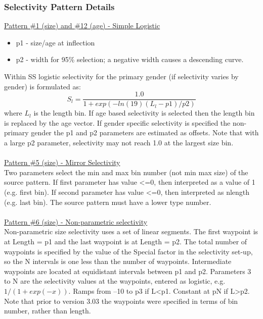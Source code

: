 \subsubsection{Selectivity Pattern Details}
\underline{Pattern \#1 (size) and \#12 (age) - Simple Logistic}
\begin{itemize}
	\item p1 - size/age at inflection
	\item p2 - width for 95\% selection; a negative width causes a descending curve.
\end{itemize}
Within SS logistic selectivity for the primary gender (if selectivity varies by gender) is formulated as:
\begin{equation}
	S_l = \frac{1.0}{1+exp(-ln(19)(L_l - p1)/p2)}
\end{equation}
where $L_l$ is the length bin.  If age based selectivity is selected then the length bin is replaced by the age vector. If gender specific selectivity is specified the non-primary gender the p1 and p2 parameters are estimated as offsets.  Note that with a large p2 parameter, selectivity may not reach 1.0 at the largest size bin.\\
\hfil
\\
\underline{Pattern \#5 (size) - Mirror Selectivity}\\
Two parameters select the min and max bin number (not min max size) of the source pattern.  If first parameter has value <=0, then interpreted as a value of 1 (e.g. first bin).  If second parameter has value <=0, then interpreted as nlength (e.g. last bin). The source pattern must have a lower type number.\\
\hfil
\\
\underline{Pattern \#6 (size) - Non-parametric selectivity}\\
Non-parametric size selectivity uses a set of linear segments.  The first waypoint is at Length = p1 and the last waypoint is at Length = p2.  The total number of waypoints is specified by the value of the Special factor in the selectivity set-up, so the N intervals is one less than the number of waypoints.  Intermediate waypoints are located at equidistant intervals between p1 and p2.  Parameters 3 to N are the selectivity values at the waypoints, entered as logistic, e.g. $1/(1+exp(-x))$.  Ramps from –10 to p3 if L<p1.  Constant at pN if L>p2.  Note that prior to version 3.03 the waypoints were specified in terms of bin number, rather than length.\\
\hfil
\\
